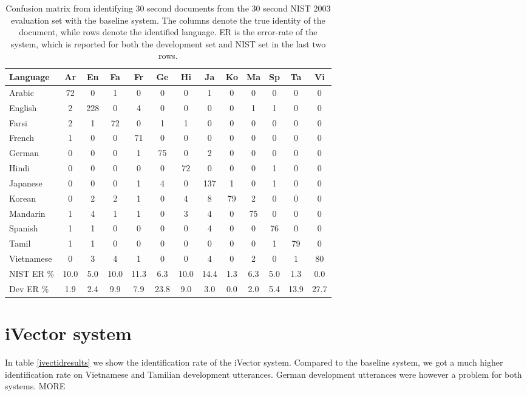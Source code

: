 \begin{table}[hbt!]
\begin{tabular}{| l | c | c | c | c | c | c | c | c | c | c | c | c |}
\hline
Language &Ar & En & Fa & Fr & Ge & Hi & Ja & Ko & Ma & Sp & Ta & Vi \\
\hline
Arabic & 72 & 0 & 1 & 0 & 0 & 0 & 1 & 0 & 0 & 0 & 0 & 0 \\
English & 2 & 228 & 0 & 4 & 0 & 0 & 0 & 0 & 1 & 1 & 0 & 0 \\
Farsi & 2 & 1 & 72 & 0 & 1 & 1 & 0 & 0 & 0 & 0 & 0 & 0 \\
French & 1 & 0 & 0 & 71 & 0 & 0 & 0 & 0 & 0 & 0 & 0 & 0 \\
German & 0 & 0 & 0 & 1 & 75 & 0 & 2 & 0 & 0 & 0 & 0 & 0 \\
Hindi & 0 & 0 & 0 & 0 & 0 & 72 & 0 & 0 & 0 & 1 & 0 & 0 \\
Japanese & 0 & 0 & 0 & 1 & 4 & 0 & 137 & 1 & 0 & 1 & 0 & 0 \\
Korean & 0 & 2 & 2 & 1 & 0 & 4 & 8 & 79 & 2 & 0 & 0 & 0 \\
Mandarin & 1 & 4 & 1 & 1 & 0 & 3 & 4 &  0 & 75 & 0 & 0 & 0 \\
Spanish & 1 & 1 & 0 & 0 &  0 & 0 & 4 & 0 & 0 & 76 & 0 & 0 \\
Tamil & 1 & 1 & 0 & 0 & 0 & 0 & 0 & 0 & 0 & 1 & 79 & 0 \\
Vietnamese & 0 & 3 & 4 & 1 & 0 & 0 & 4 & 0 & 2 & 0 & 1  & 80 \\
\hline
NIST ER \% & 10.0 & 5.0 & 10.0 & 11.3 & 6.3 & 10.0 & 14.4 & 1.3 & 6.3 & 5.0 & 1.3 & 0.0 \\
\hline
Dev ER \% & 1.9 & 2.4 & 9.9 & 7.9 & 23.8 & 9.0 & 3.0 & 0.0 & 2.0 & 5.4 & 13.9 & 27.7 \\
\hline
\end{tabular}
\caption{Confusion matrix from identifying 30 second documents from the 30 second NIST 2003 evaluation set with the baseline system. The columns denote the true identity of the document, while rows denote the identified language. ER is the error-rate of the system, which is reported for both the development set and NIST set in the last two rows.}
\label{baseidresults}
\end{table}

\section{iVector system}

In table \ref{ivectidresults} we show the identification rate of the iVector system. Compared to the baseline system, we got a much higher identification rate on Vietnamese and Tamilian development utterances. German development utterances were however a problem for both systems. MORE


